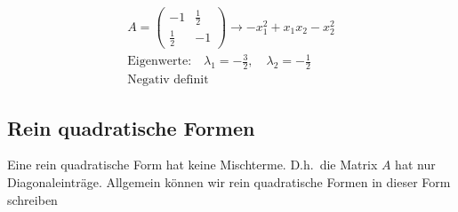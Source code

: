 \begin{figure}[h]
    \centering
    \begin{minipage}{0.39\textwidth}
        \centering
    \end{minipage}
    \hfill
    \begin{minipage}{0.6\textwidth}
        \begin{equation*}
            \begin{aligned}
                A = \begin{pmatrix} -1 & \frac{1}{2} \\ \frac{1}{2} & -1 \end{pmatrix} \rightarrow -x_1^2 + x_1x_2 - x_2^2 \\[0.5em]
                \text{Eigenwerte:} \quad \lambda_1 = - \frac{3}{2}, \quad \lambda_2 = - \frac{1}{2} \\[0.5em]
                \text{Negativ definit} \qquad \qquad
            \end{aligned}
        \end{equation*}
    \end{minipage}
\end{figure}

\subsection{Rein quadratische Formen}

Eine rein quadratische Form hat keine Mischterme. D.h.\ die Matrix \( A \)  hat nur Diagonaleinträge. Allgemein können wir rein quadratische Formen in dieser Form schreiben

